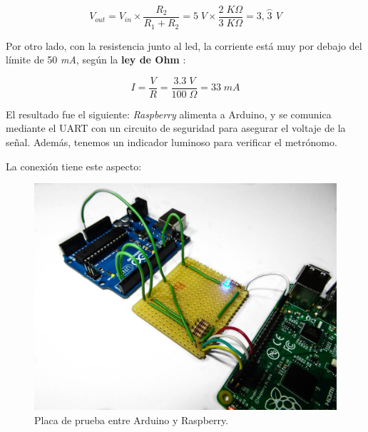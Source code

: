 \begin{equation}
	V_{out} = V_{in} \times \frac{R_2}{R_1 + R_2} = 5 \; V \times \frac{2 \; K\Omega}{3 \; K\Omega} = 3,\stackrel{\frown}{3} \; V
\end{equation}

\smallskip

Por otro lado, con la resistencia junto al \acrshort{led}, la corriente está muy por debajo del límite de 50 \textit{mA}, según la \textbf{ley de Ohm} \cite{wiki_ohm}:

\smallskip

\begin{equation}
	I = \frac{V}{R} = \frac{3.3 \; V}{100 \; \Omega} = 33 \; mA
\end{equation}

\smallskip

El resultado fue el siguiente: \textit{Raspberry} alimenta a Arduino, y se comunica mediante el \acrshort{UART} con un circuito de seguridad para asegurar el voltaje de la señal. Además, tenemos un indicador luminoso para verificar el metrónomo.

La conexión tiene este aspecto:

\smallskip

\begin{figure}[H]
	\noindent \begin{centering}
		\includegraphics[width=\linewidth*2/3]{capitulo6/proto_uart}
		\par\end{centering}
	\smallskip
	\caption{\label{fig:proto_uart} Placa de prueba entre Arduino y Raspberry.}
\end{figure} 

